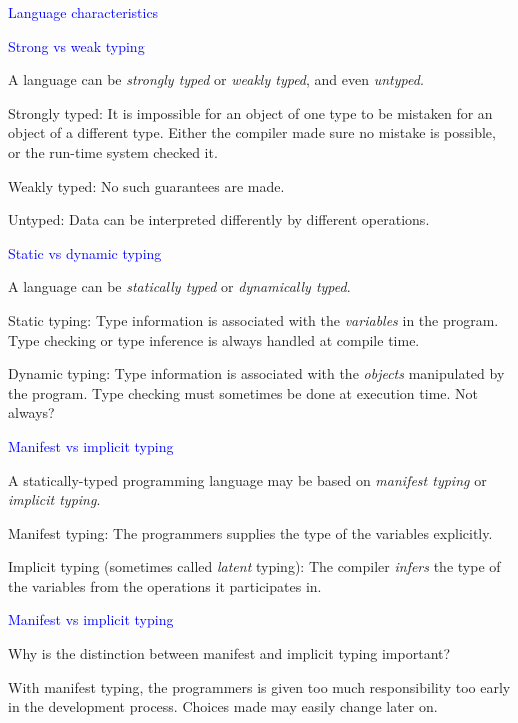 \documentclass{slides}
\newcommand{\ti}[1]{\begin{center}\Large{\textcolor{blue}{#1}}\end{center}}
\begin{document}
\begin{slide}\ti{Language characteristics}

\vfill\end{slide}
\begin{slide}\ti{Strong vs weak typing}

A language can be \emph{strongly typed} or \emph{weakly typed}, and
even \emph{untyped}.

Strongly typed: It is impossible for an object of one type to be
mistaken for an object of a different type.  Either the compiler made
sure no mistake is possible, or the run-time system checked it.

Weakly typed: No such guarantees are made.

Untyped: Data can be interpreted differently by different operations.

\vfill\end{slide}
\begin{slide}\ti{Static vs dynamic typing}

A language can be \emph{statically typed} or \emph{dynamically
  typed}.

Static typing: Type information is associated with the
\emph{variables} in the program.  Type checking or type inference is
always handled at compile time.

Dynamic typing: Type information is associated with the \emph{objects}
manipulated by the program.  Type checking must sometimes be done at
execution time.  Not always?

\vfill\end{slide}
\begin{slide}\ti{Manifest vs implicit typing}

A statically-typed programming language may be based on \emph{manifest
  typing} or \emph{implicit typing}.

Manifest typing: The programmers supplies the type of the variables
explicitly.

Implicit typing (sometimes called \emph{latent} typing): The compiler
\emph{infers} the type of the variables from the operations it
participates in.

\vfill\end{slide}
\begin{slide}\ti{Manifest vs implicit typing}

Why is the distinction between manifest and implicit typing important?

With manifest typing, the programmers is given too much responsibility
too early in the development process.  Choices made may easily change
later on.

\vfill\end{slide}
\end{document}

